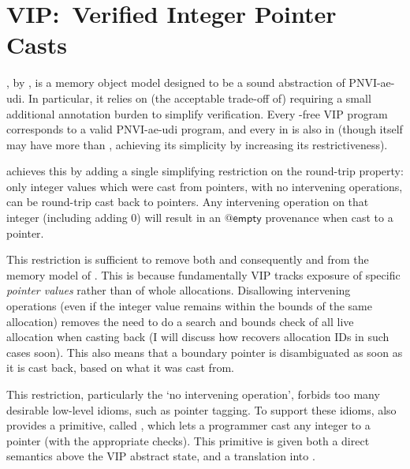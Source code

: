 \section{VIP:\ Verified Integer Pointer Casts}

, by , is a memory object model designed
to be a sound abstraction of PNVI-ae-udi. In particular, it relies on (the
acceptable trade-off of) requiring a small additional annotation burden to
simplify verification. Every -free VIP program corresponds to a valid
PNVI-ae-udi program, and every  in  is also  in
 (though  itself may have more  than ,
achieving its simplicity by increasing its restrictiveness).

 achieves this by adding a single simplifying restriction on the
round-trip property: only integer values which were cast from pointers, with no
intervening operations, can be round-trip cast back to pointers. Any
intervening operation on that integer (including adding 0) will result in an
$\mathsf{@empty}$ provenance when cast to a pointer.

This restriction is sufficient to remove both  and
consequently  and from the memory model of
. This is because fundamentally VIP tracks exposure of specific
\emph{pointer values} rather than of whole allocations. Disallowing intervening
operations (even if the integer value remains within the bounds of the same
allocation) removes the need to do a search and bounds check of all live
allocation when casting back (I will discuss how  recovers allocation
IDs in such cases soon). This also means that a boundary pointer is
disambiguated as soon as it is cast back, based on what it was cast from.

This restriction, particularly the `no intervening operation', forbids too
many desirable low-level idioms, such as pointer tagging. To
support these idioms,  also provides a primitive, called
, which lets a %
programmer cast any integer to a pointer (with the appropriate checks).
This primitive is given both a direct semantics above the VIP abstract
state, and a translation into .

